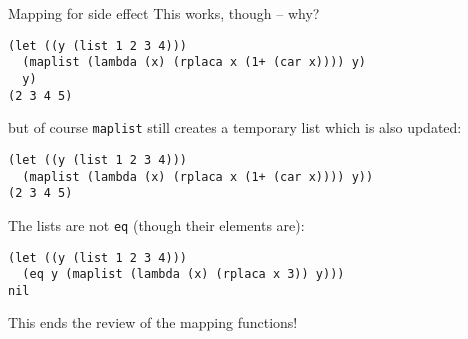 \documentclass[presentation]{beamer}
\begin{document}
\begin{frame}[fragile]{Mapping for side effect}
This works, though -- why?
\begin{verbatim}
(let ((y (list 1 2 3 4)))
  (maplist (lambda (x) (rplaca x (1+ (car x)))) y)
  y)
(2 3 4 5)
\end{verbatim}
but of course \texttt{maplist} still creates a temporary list which is also updated:
\begin{verbatim}
(let ((y (list 1 2 3 4)))
  (maplist (lambda (x) (rplaca x (1+ (car x)))) y))
(2 3 4 5)
\end{verbatim}
The lists are not \texttt{eq} (though their elements are):
\begin{verbatim}
(let ((y (list 1 2 3 4)))
  (eq y (maplist (lambda (x) (rplaca x 3)) y)))
nil
\end{verbatim}
\bigskip
This ends the review of the mapping functions!
\end{frame}
\end{document}
